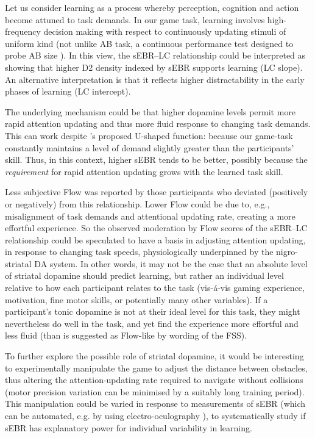 \documentclass[10pt,letterpaper,floatsintext]{article}
\begin{document}
Let us consider learning as a process whereby perception, cognition and action become attuned to task demands. In our game task, learning involves high-frequency decision making with respect to continuously updating stimuli of uniform kind (not unlike AB task, a continuous performance test designed to probe AB size \cite{Slagter2012}). In this view, the sEBR--LC relationship could be interpreted as showing that higher D2 density indexed by sEBR supports learning (LC slope). An alternative interpretation is that it reflects higher distractability in the early phases of learning (LC intercept).

The underlying mechanism could be that higher dopamine levels permit more rapid attention updating and thus more fluid response to changing task demands. This can work despite \cite{Slagter2012}'s proposed U-shaped function: because our game-task constantly maintains a level of demand slightly greater than the participants' skill. Thus, in this context, higher sEBR tends to be better, possibly because the {\it requirement} for rapid attention updating grows with the learned task skill.

Less subjective Flow was reported by those participants who deviated (positively or negatively) from this relationship. Lower Flow could be due to, e.g., misalignment of task demands and attentional updating rate, creating a more effortful experience. So the observed moderation by Flow scores of the sEBR--LC relationship could be speculated to have a basis in adjusting attention updating, in response to changing task speeds, physiologically underpinned by the nigro-striatal DA system. In other words, it may not be the case that an absolute level of striatal dopamine should predict learning, but rather an individual level relative to how each participant relates to the task (vis-\'{a}-vis gaming experience, motivation, fine motor skills, or potentially many other variables). If a participant's tonic dopamine is not at their ideal level for this task, they might nevertheless do well in the task, and yet find the experience more effortful and less fluid (than is suggested as Flow-like by wording of the FSS).


To further explore the possible role of striatal dopamine, it would be interesting to experimentally manipulate the game to adjust the distance between obstacles, thus altering the attention-updating rate required to navigate without collisions (motor precision variation can be minimised by a suitably long training period). This manipulation could be varied in response to measurements of sEBR (which can be automated, e.g. by using electro-oculography \cite{toivanen2014}), to systematically study if sEBR has explanatory power for individual variability in learning.
\end{document}
